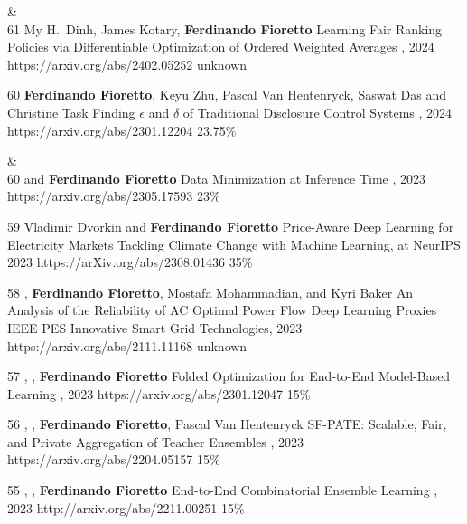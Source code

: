 \begin{pubs}

{}&\nemph{\rule{0.5\linewidth}{0.5pt}}\\[1em]
\confentry
	{61}
	{\student{} My H.~Dinh, \student{} James Kotary, {\bf Ferdinando Fioretto}}
	{Learning Fair Ranking Policies via Differentiable Optimization of Ordered Weighted Averages}
	{\procFAccT, 2024}
	{https://arxiv.org/abs/2402.05252}
	{unknown}

\confentry
	{60}
	{{\bf Ferdinando Fioretto}, Keyu Zhu, Pascal Van Hentenryck, \student{} Saswat Das and Christine Task}
  	{Finding $\epsilon$ and $\delta$ of Traditional Disclosure Control Systems}
	{\procAAAI, 2024}
	{https://arxiv.org/abs/2301.12204}
	{23.75\%}

{}&\nemph{\rule{0.5\linewidth}{0.5pt}}\\[1em]

\confentry
	{60}
	{ and {\bf Ferdinando Fioretto}}
	{Data Minimization at Inference Time}
	{\procNeurIPS, 2023}
	{https://arxiv.org/abs/2305.17593}
	{23\%}

\confentry
	{59}
 	{Vladimir Dvorkin and {\bf Ferdinando Fioretto}}
  	{Price-Aware Deep Learning for Electricity Markets}
  	{Tackling Climate Change with Machine Learning, at NeurIPS 2023}
  	{https://arXiv.org/abs/2308.01436}
  	{35\%}

\confentry
	{58}
	{, {\bf Ferdinando Fioretto}, Mostafa Mohammadian, and Kyri Baker}
	{An Analysis of the Reliability of AC Optimal Power Flow Deep Learning Proxies}
	{IEEE PES Innovative Smart Grid Technologies, 2023}
	{https://arxiv.org/abs/2111.11168}
	{unknown}

\confentry 
	{57} %
	{, , {\bf Ferdinando Fioretto}}
	{Folded Optimization for End-to-End Model-Based Learning}
	{\procIJCAI, 2023}
	{https://arxiv.org/abs/2301.12047}
	{15\%}

\confentry
    {56} %
	{, , {\bf Ferdinando Fioretto}, Pascal Van Hentenryck}
	{SF-PATE: Scalable, Fair, and Private Aggregation of Teacher Ensembles}
    {\procIJCAI, 2023}
	{https://arxiv.org/abs/2204.05157}
    {15\%}

\confentry
    {55} %
	{, , {\bf Ferdinando Fioretto}}
	{End-to-End Combinatorial Ensemble Learning}
    {\procIJCAI, 2023}
	{http://arxiv.org/abs/2211.00251}
    {15\%}


\end{pubs}
